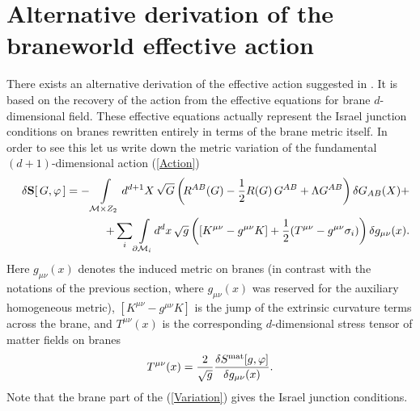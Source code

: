 \documentclass[a4paper,12pt]{article}
\newcommand{\ddim}{{d}}
\newcommand{\DDim}{{(d+\!1)}}
\newcommand{\M}{{\cal M}}
\newcommand{\dM}{{\partial \cal M}}
\newcommand{\tens}{{\sigma}}
\begin{document}
\section{Alternative derivation of the braneworld effective
action} \label{Neumann}
\hspace{\parindent}There exists an
alternative derivation of the effective action suggested in
\cite{brane,BWEA}. It is based on the recovery of the action from
the effective equations for brane $d$-dimensional field. These
effective equations actually represent the Israel junction
conditions on branes rewritten entirely in terms of the brane
metric itself. In order to see this let us write down the metric
variation of the fundamental $\DDim$-dimensional action
(\ref{Action})
     \begin{eqnarray}
      &&\delta{\mathbf S}[\,G,\varphi\,]=
      -\int\limits_{\M\times Z_2} d^{d+1}X\,
      \sqrt{G}\left(\!R^{AB}(G)
      -\frac12\,\!R(G)\,
      G^{AB}+\Lambda G^{AB}\right)\delta G_{AB}(X)+  \nonumber\\
      &&\qquad\quad
      +\sum\limits_i\int\limits_{\dM_i}\!
      d^{\ddim}x\,
      \sqrt{g}\left([K^{\mu\nu}
      -g^{\mu\nu}K]
      +\frac12(T^{\mu\nu}
      -g^{\mu\nu}\tens_i)\right)
      \delta g_{\mu\nu}(x).            \label{Variation}
     \end{eqnarray}
Here $g_{\mu\nu}(x)$ denotes the induced metric on branes (in
contrast with the notations of the previous section, where
$g_{\mu\nu}(x)$ was reserved for the auxiliary homogeneous
metric), $\left[K^{\mu\nu}-g^{\mu\nu}K\right]$ is the jump of the
extrinsic curvature terms across the brane, and $T^{\mu\nu}(x)$ is
the corresponding $\ddim$-dimensional stress tensor of matter
fields on branes
    \begin{eqnarray}
     T^{\mu\nu}(x)=\frac2{\sqrt{g}}
     \frac{\delta S^{\rm mat}[g,\varphi]}
     {\delta g_{\mu\nu}(x)}.         \label{StressTensor}
    \end{eqnarray}
Note that the brane part of the (\ref{Variation}) gives the Israel
junction conditions.
\end{document}
